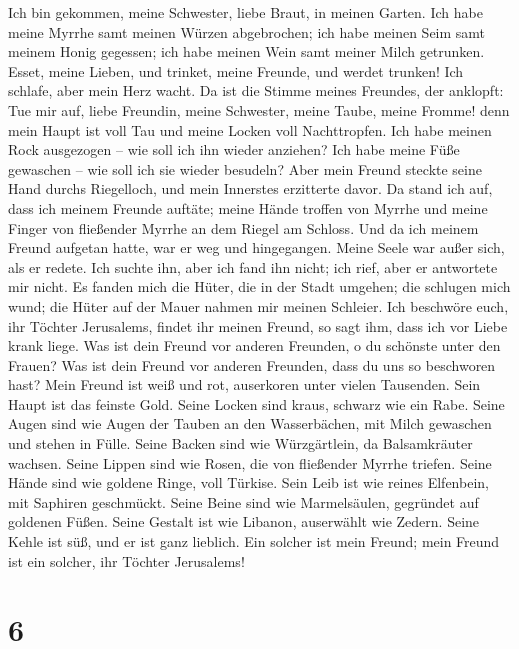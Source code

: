  Ich bin gekommen, meine Schwester, liebe Braut, in meinen
Garten. Ich habe meine Myrrhe samt meinen Würzen abgebrochen; ich habe
meinen Seim samt meinem Honig gegessen; ich habe meinen Wein samt meiner
Milch getrunken. Esset, meine Lieben, und trinket, meine Freunde, und
werdet trunken!  Ich schlafe, aber mein Herz wacht. Da ist
die Stimme meines Freundes, der anklopft: Tue mir auf, liebe Freundin,
meine Schwester, meine Taube, meine Fromme! denn mein Haupt ist voll Tau
und meine Locken voll Nachttropfen.  Ich habe meinen Rock
ausgezogen -- wie soll ich ihn wieder anziehen? Ich habe meine Füße
gewaschen -- wie soll ich sie wieder besudeln?  Aber mein
Freund steckte seine Hand durchs Riegelloch, und mein Innerstes
erzitterte davor.  Da stand ich auf, dass ich meinem
Freunde auftäte; meine Hände troffen von Myrrhe und meine Finger von
fließender Myrrhe an dem Riegel am Schloss.  Und da ich
meinem Freund aufgetan hatte, war er weg und hingegangen. Meine Seele
war außer sich, als er redete. Ich suchte ihn, aber ich fand ihn nicht;
ich rief, aber er antwortete mir nicht.  Es fanden mich
die Hüter, die in der Stadt umgehen; die schlugen mich wund; die Hüter
auf der Mauer nahmen mir meinen Schleier.  Ich beschwöre
euch, ihr Töchter Jerusalems, findet ihr meinen Freund, so sagt ihm,
dass ich vor Liebe krank liege.  Was ist dein Freund vor
anderen Freunden, o du schönste unter den Frauen? Was ist dein Freund
vor anderen Freunden, dass du uns so beschworen hast? 
Mein Freund ist weiß und rot, auserkoren unter vielen Tausenden.
 Sein Haupt ist das feinste Gold. Seine Locken sind
kraus, schwarz wie ein Rabe.  Seine Augen sind wie Augen
der Tauben an den Wasserbächen, mit Milch gewaschen und stehen in Fülle.
 Seine Backen sind wie Würzgärtlein, da Balsamkräuter
wachsen. Seine Lippen sind wie Rosen, die von fließender Myrrhe triefen.
 Seine Hände sind wie goldene Ringe, voll Türkise. Sein
Leib ist wie reines Elfenbein, mit Saphiren geschmückt. 
Seine Beine sind wie Marmelsäulen, gegründet auf goldenen Füßen. Seine
Gestalt ist wie Libanon, auserwählt wie Zedern.  Seine
Kehle ist süß, und er ist ganz lieblich. Ein solcher ist mein Freund;
mein Freund ist ein solcher, ihr Töchter Jerusalems!

\hypertarget{section-5}{%
\section{6}\label{section-5}}

